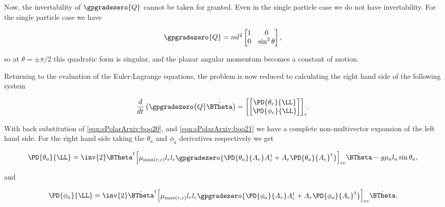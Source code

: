 Now, the invertability of $\gpgradezero{Q}$ cannot be taken for granted.  Even in the single particle case we do not have invertability.  For the single particle case we have

\begin{align}\label{eqn:sPolarArxiv:boo45}
\gpgradezero{Q} =
m l^2 
\begin{bmatrix}
1 & 0 \\
0 & \sin^2 \theta
\end{bmatrix},
\end{align}

so at $\theta = \pm \pi/2$ this quadratic form is singular, and the planar angular momentum becomes a constant of motion.

Returning to the evaluation of the Euler-Lagrange equations, the problem is now reduced to calculating the right hand side of the following system

\begin{align}\label{eqn:sPolarArxiv:boo23}
\frac{d}{dt} \left( \gpgradezero{Q} \dot{\BTheta} \right) =
{\begin{bmatrix}
\begin{bmatrix}
\PD{\theta_r}{\LL} \\
\PD{\phi_r}{\LL} \\
\end{bmatrix}
\end{bmatrix}}_r.
\end{align}

With back substitution of \ref{eqn:sPolarArxiv:boo20}, and \ref{eqn:sPolarArxiv:boo21} we have a complete non-multivector expansion of the left hand side.  For the right hand side taking the $\theta_a$ and $\phi_a$ derivatives respectively we get

\begin{align}\label{eqn:sPolarArxiv:boo6}
\PD{\theta_a}{\LL}
=
\inv{2} \dot{\BTheta}^\dagger
{\begin{bmatrix}
\mu_{\max(r,c)} l_r l_c \gpgradezero{
\PD{\theta_a}{A_r} A_c^\dagger
+A_r \PD{\theta_a}{A_c}^\dagger
}
\end{bmatrix}}_{rc} 
\dot{\BTheta}
-g \mu_a l_a \sin\theta_a,
\end{align}

and

\begin{align}\label{eqn:sPolarArxiv:boo6c}
\PD{\phi_a}{\LL}
=
\inv{2} \dot{\BTheta}^\dagger
{\begin{bmatrix}
\mu_{\max(r,c)} l_r l_c \gpgradezero{
\PD{\phi_a}{A_r} A_c^\dagger
+A_r \PD{\phi_a}{A_c}^\dagger
}
\end{bmatrix}}_{rc} 
\dot{\BTheta}.
\end{align}

